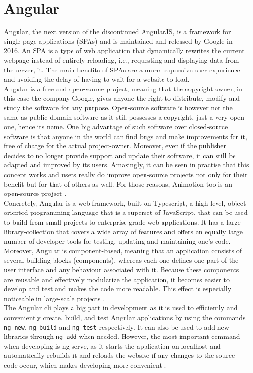 \section{Angular}
Angular, the next version of the discontinued AngularJS, is a framework for single-page applications (SPAs) and is maintained and released
by Google in 2016. An SPA is a type of web application that dynamically rewrites the current webpage instead of entirely reloading, i.e.,
requesting and displaying data from the server, it. The main benefits of SPAs are a more responsive user experience and avoiding the delay
of having to wait for a website to load. \cite{RoadToReact}
\\
Angular is a free and open-source project, meaning that the copyright owner, in this case the company Google,
gives anyone the right to distribute, modify and study the software for any purpose. Open-source software is 
however not the same as public-domain software as it still possesses a copyright, just a very open one, hence its name. 
One big advantage of such software over closed-source software is that anyone in the world can find bugs and make 
improvements for it, free of charge for the actual project-owner. Moreover, even if the publisher decides to no longer 
provide support and update their software, it can still be adapted and improved by its users. Amazingly, it can be seen 
in practise that this concept works and users really do improve open-source projects not only for their benefit but for 
that of others as well. For those reasons, Animotion too is an open-source project \cite{Opensource}.
\\
Concretely, Angular is a web framework, built on Typescript, a high-level, object-oriented programming language that is 
a superset of JavaScript, that can be used to build from small projects to enterprise-grade web applications. It has a 
large library-collection that covers a wide array of features and offers an equally large number of developer tools for 
testing, updating and maintaining one's code. Moreover, Angular is component-based, meaning that an application consists 
of several building blocks (components), whereas each one defines one part of the user interface and any behaviour associated 
with it. Because these components are reusable and effectively modularize the application, it becomes easier to develop and 
test and makes the code more readable. This effect is especially noticeable in large-scale projects \cite{AngularDescription}.
\\
The Angular \gls{cli} plays a big part in development as it is used to efficiently and 
conveniently create, build, and test Angular applications by using the commands \texttt{ng new}, \texttt{ng build}
and \texttt{ng test} respectively. It can also be used to add new libraries through \texttt{ng add}
when needed. However, the most important command when developing is ng serve, as it starts the application on
localhost and automatically rebuilds it and reloads the website if any changes to the source code occur, which makes 
developing more convenient \cite{AngularCLI}.
\\
